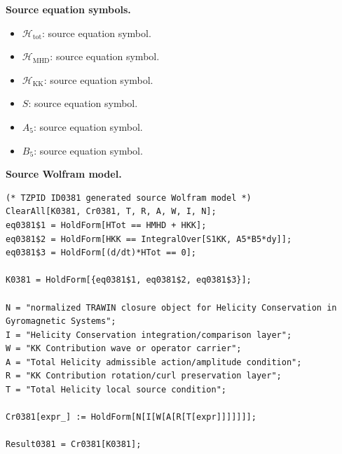 \begin{minipage}[t]{0.49\linewidth}
\begingroup
\small
\raggedright
\textbf{Source equation symbols.}\par
\begin{itemize}[leftmargin=1.35em,itemsep=1pt,topsep=1pt,parsep=0pt]
    \item $\mathcal{H}_{\mathrm{tot}}$: source equation symbol.
    \item $\mathcal{H}_{\mathrm{MHD}}$: source equation symbol.
    \item $\mathcal{H}_{\mathrm{KK}}$: source equation symbol.
    \item $S$: source equation symbol.
    \item $A_{5}$: source equation symbol.
    \item $B_{5}$: source equation symbol.
\end{itemize}
\endgroup
\end{minipage}\hfill
\begin{minipage}[t]{0.47\linewidth}
\begingroup
\scriptsize
\raggedright
\textbf{Source Wolfram model.}\par
\begin{Verbatim}[fontsize=\tiny,breaklines=true,breakanywhere=true]
(* TZPID ID0381 generated source Wolfram model *)
ClearAll[K0381, Cr0381, T, R, A, W, I, N];
eq0381$1 = HoldForm[HTot == HMHD + HKK];
eq0381$2 = HoldForm[HKK == IntegralOver[S1KK, A5*B5*dy]];
eq0381$3 = HoldForm[(d/dt)*HTot == 0];

K0381 = HoldForm[{eq0381$1, eq0381$2, eq0381$3}];

N = "normalized TRAWIN closure object for Helicity Conservation in Gyromagnetic Systems";
I = "Helicity Conservation integration/comparison layer";
W = "KK Contribution wave or operator carrier";
A = "Total Helicity admissible action/amplitude condition";
R = "KK Contribution rotation/curl preservation layer";
T = "Total Helicity local source condition";

Cr0381[expr_] := HoldForm[N[I[W[A[R[T[expr]]]]]]];

Result0381 = Cr0381[K0381];
\end{Verbatim}
\endgroup
\end{minipage}

